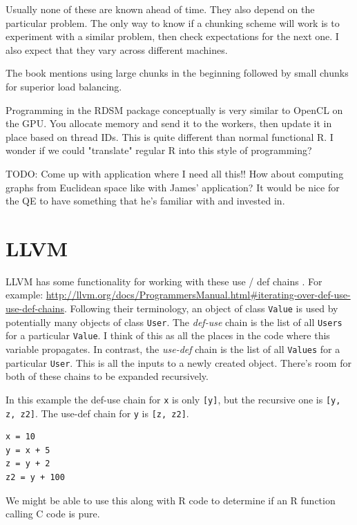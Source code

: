\documentclass[12pt]{article}
\begin{document}
Usually none of these are known ahead of time.  They also depend on the
particular problem.  The only way to know if a chunking scheme will work is
to experiment with a similar problem, then check expectations for the next
one. I also expect that they vary across different machines.

The book mentions using large chunks in the beginning followed by small
chunks for superior load balancing.

Programming in the RDSM package conceptually is very similar to OpenCL on
the GPU. You allocate memory and send it to the workers, then update it in
place based on thread IDs. This is quite different than normal functional
R. I wonder if we could "translate" regular R into this style of
programming?

TODO: Come up with application where I need all this!! How about computing
graphs from Euclidean space like with James' application? It would be nice
for the QE to have something that he's familiar with and invested in.

\appendix
\section{LLVM}

LLVM has some functionality for working with these use / def chains
\cite{Lattner2004}. For example:
\url{http://llvm.org/docs/ProgrammersManual.html#iterating-over-def-use-use-def-chains}.
Following their terminology, an object of class \texttt{Value} is used by
potentially many objects of class \texttt{User}. The \emph{def-use} chain
is the list of all \texttt{Users} for a particular \texttt{Value}. I think
of this as all the places in the code where this variable propagates. In
contrast, the \emph{use-def} chain is the list of all \texttt{Values} for a
particular \texttt{User}. This is all the inputs to a newly
created object. There's room for both of these chains to be expanded recursively.

In this example the def-use chain for \texttt{x} is only \texttt{[y]}, but the
recursive one is \texttt{[y, z, z2]}. The use-def chain for \texttt{y} is
\texttt{[z, z2]}.

\begin{verbatim}
x = 10
y = x + 5
z = y + 2
z2 = y + 100
\end{verbatim}

We might be able to use this along with R code to determine if an R
function calling C code is pure.



 
\end{document}
